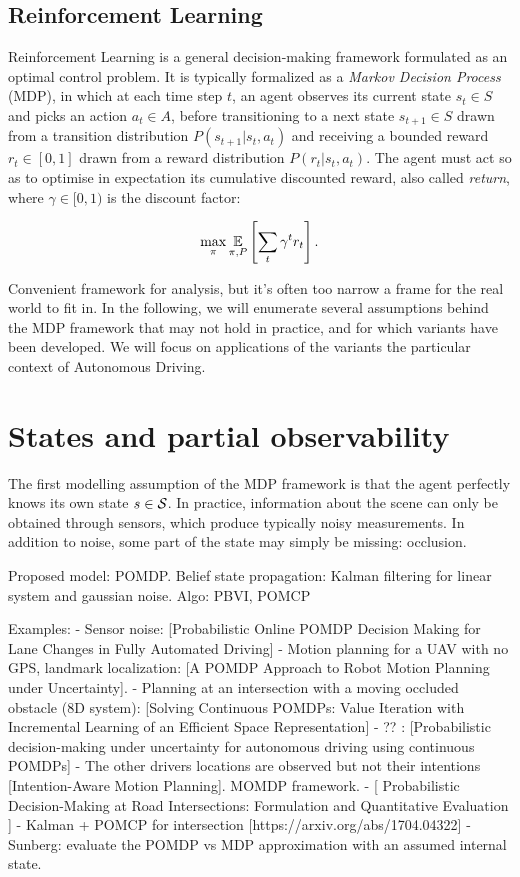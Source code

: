 \subsection{Reinforcement Learning}

Reinforcement Learning is a general decision-making framework formulated as an optimal control problem. It is typically formalized as a \emph{Markov Decision Process} (MDP), in which at each time step $t$, an agent observes its current state $s_t\in S$ and picks an action $a_t\in A$, before transitioning to a next state $s_{t+1}\in S$ drawn from a transition distribution $P(s_{t+1}|s_t,a_t)$ and receiving a bounded reward $r_t\in[0, 1]$ drawn from a reward distribution $P(r_t|s_t,a_t)$. The agent must act so as to optimise in expectation its cumulative discounted reward, also called \emph{return}, where $\gamma\in[0,1)$ is the discount factor:

\begin{equation*}
\max_{\pi}\operatorname*{\mathbb{E}}_{\pi, P} \left[\sum_t \gamma^t r_t\right].
\end{equation*}

Convenient framework for analysis, but it's often too narrow a frame for the real world to fit in. In the following, we will enumerate several assumptions behind the MDP framework that may not hold in practice, and for which variants have been developed. We will focus on applications of the variants the particular context of Autonomous Driving.

\section{States and partial observability}

The first modelling assumption of the MDP framework is that the agent perfectly knows its own state $s\in\mathcal{S}$. In practice, information about the scene can only be obtained through sensors, which produce typically noisy measurements. In addition to noise, some part of the state may simply be missing: occlusion.

Proposed model: POMDP.
Belief state propagation: Kalman filtering for linear system and gaussian noise.
Algo: PBVI, POMCP

Examples:
- Sensor noise: [Probabilistic Online POMDP Decision Making for Lane Changes in Fully Automated Driving]
- Motion planning for a UAV with no GPS, landmark localization: [A POMDP Approach to Robot Motion Planning under Uncertainty]. 
- Planning at an intersection with a moving occluded obstacle (8D system): [Solving Continuous POMDPs:  Value Iteration with Incremental Learning of an Efficient Space Representation]
- ?? : [Probabilistic decision-making under uncertainty for autonomous driving using continuous POMDPs]
- The other drivers locations are observed but not their intentions [Intention-Aware Motion Planning]. MOMDP framework.
- [ Probabilistic Decision-Making at Road Intersections: Formulation and Quantitative Evaluation ]
- Kalman + POMCP for intersection [https://arxiv.org/abs/1704.04322]
- Sunberg: evaluate the POMDP vs MDP approximation with an assumed internal state.
 

